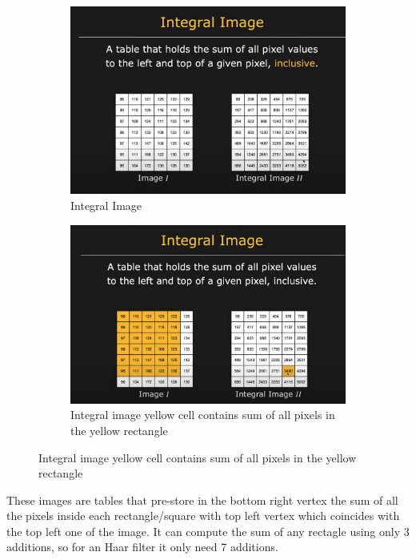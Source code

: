 \documentclass[12pt,a4paper]{article}
\begin{document}
\begin{large}
\begin{figure} [!h]
  \centering
    \begin{subfigure}[b]{0.4\textwidth}
      \centering
      \captionsetup{justification=centering}
        \includegraphics[width=\textwidth]{images/haar6.png}
        \caption{Integral Image}
        
    \end{subfigure}
    \hspace{0.1cm}
    \begin{subfigure}[b]{0.4\textwidth}
      \centering
      \captionsetup{justification=centering}
        \includegraphics[width=\textwidth]{images/haar7.png}
        \caption{Integral image yellow cell contains sum of all pixels in the yellow rectangle}

      \end{subfigure}
  \end{figure}
These images are tables that pre-store in the bottom right vertex the sum of all the pixels inside each rectangle/square with top left vertex which coincides with the top left one of the image. It can compute the sum of any rectagle using only 3 additions, so for an Haar filter it only need 7 additions.



\end{large}
\end{document}
